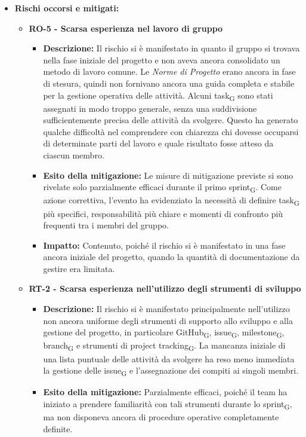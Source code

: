 ﻿\documentclass[a4paper, 10pt, colorlinks=true, linkcolor=black, urlcolor=blue, citecolor=blue, hidelinks]{article}
\begin{document}
\begin{itemize}
    \item \textbf{Rischi occorsi e mitigati:}
    \begin{itemize}
        \item \textbf{RO-5 - Scarsa esperienza nel lavoro di gruppo}
        \begin{itemize}
            \item \textbf{Descrizione:} Il rischio si è manifestato in quanto il gruppo si trovava nella fase iniziale del progetto e non aveva ancora consolidato un metodo di lavoro comune. Le \textit{Norme di Progetto} erano ancora in fase di stesura, quindi non fornivano ancora una guida completa e stabile per la gestione operativa delle attività. Alcuni task\textsubscript{G} sono stati assegnati in modo troppo generale, senza una suddivisione sufficientemente precisa delle attività da svolgere. Questo ha generato qualche difficoltà nel comprendere con chiarezza chi dovesse occuparsi di determinate parti del lavoro e quale risultato fosse atteso da ciascun membro.
            \item \textbf{Esito della mitigazione:} Le misure di mitigazione previste si sono rivelate solo parzialmente efficaci durante il primo sprint\textsubscript{G}. Come azione correttiva, l'evento ha evidenziato la necessità di definire task\textsubscript{G} più specifici, responsabilità più chiare e momenti di confronto più frequenti tra i membri del gruppo.
            \item \textbf{Impatto:} Contenuto, poiché il rischio si è manifestato in una fase ancora iniziale del progetto, quando la quantità di documentazione da gestire era limitata.
        \end{itemize}
        \item \textbf{RT-2 - Scarsa esperienza nell'utilizzo degli strumenti di sviluppo}
        \begin{itemize}
            \item \textbf{Descrizione:} Il rischio si è manifestato principalmente nell'utilizzo non ancora uniforme degli strumenti di supporto allo sviluppo e alla gestione del progetto, in particolare GitHub\textsubscript{G}, issue\textsubscript{G}, milestone\textsubscript{G}, branch\textsubscript{G} e strumenti di project tracking\textsubscript{G}. La mancanza iniziale di una lista puntuale delle attività da svolgere ha reso meno immediata la gestione delle issue\textsubscript{G} e l'assegnazione dei compiti ai singoli membri.
            \item \textbf{Esito della mitigazione:} Parzialmente efficaci, poiché il team ha iniziato a prendere familiarità con tali strumenti durante lo sprint\textsubscript{G}, ma non disponeva ancora di procedure operative completamente definite.

\end{itemize}
\end{itemize}
\end{itemize}
\end{document}
